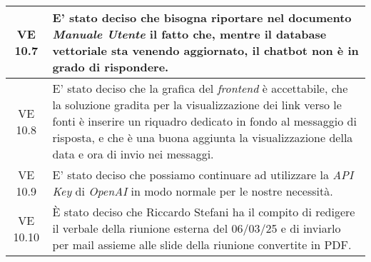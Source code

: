 \begin{table}[htbp]
\begin{tabular}{|c|p{}|}
        \hline
        VE 10.7 & E' stato deciso che bisogna riportare nel documento \emph{Manuale Utente} il fatto che, mentre il database vettoriale sta venendo aggiornato, il chatbot non è in grado di rispondere.\\
        \hline
        VE 10.8 & E' stato deciso che la grafica del \emph{frontend} è accettabile, che la soluzione gradita per la visualizzazione dei link verso le fonti è inserire un riquadro dedicato in fondo al messaggio di risposta, e che è una buona aggiunta la visualizzazione della data e ora di invio nei messaggi.\\
        \hline
        VE 10.9 & E' stato deciso che possiamo continuare ad utilizzare la \emph{API Key} di \emph{OpenAI} in modo normale per le nostre necessità.\\
        \hline
        VE 10.10 & È stato deciso che Riccardo Stefani ha il compito di redigere il verbale della riunione esterna del 06/03/25 e di inviarlo per mail assieme alle slide della riunione convertite in PDF.\\
        \hline
    \end{tabular}
\end{table}